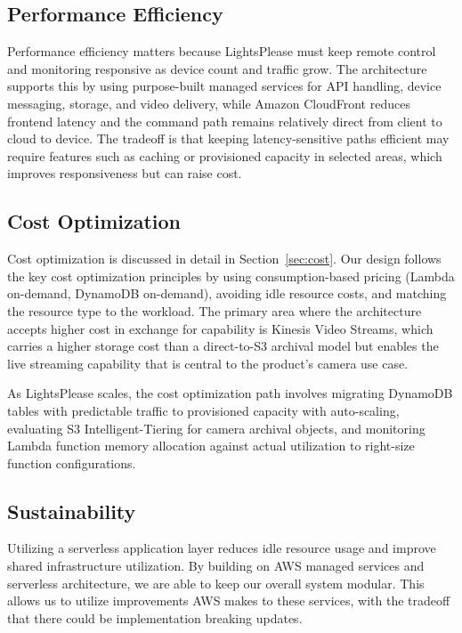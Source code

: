\subsection{Performance Efficiency}

Performance efficiency matters because LightsPlease must keep remote control and monitoring responsive as device count and traffic grow. The architecture supports this by using purpose-built managed services for API handling, device messaging, storage, and video delivery, while Amazon CloudFront reduces frontend latency and the command path remains relatively direct from client to cloud to device. The tradeoff is that keeping latency-sensitive paths efficient may require features such as caching or provisioned capacity in selected areas, which improves responsiveness but can raise cost.

\subsection{Cost Optimization}

Cost optimization is discussed in detail in Section~\ref{sec:cost}. Our design follows the key cost optimization principles by using consumption-based pricing (Lambda on-demand, DynamoDB on-demand), avoiding idle resource costs, and matching the resource type to the workload. The primary area where the architecture accepts higher cost in exchange for capability is Kinesis Video Streams, which carries a higher storage cost than a direct-to-S3 archival model but enables the live streaming capability that is central to the product's camera use case.

As LightsPlease scales, the cost optimization path involves migrating DynamoDB tables with predictable traffic to provisioned capacity with auto-scaling, evaluating S3 Intelligent-Tiering for camera archival objects, and monitoring Lambda function memory allocation against actual utilization to right-size function configurations.

\subsection{Sustainability}

Utilizing a serverless application layer reduces idle resource usage and improve shared infrastructure utilization. By building on AWS managed services and serverless architecture, we are able to keep our overall system modular. This allows us to utilize improvements AWS makes to these services, with the tradeoff that there could be implementation breaking updates.
